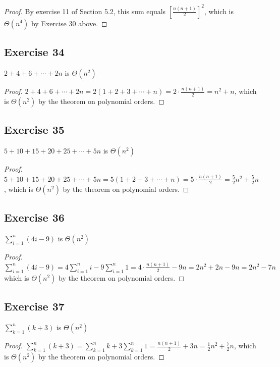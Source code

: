 \documentclass[14pt]{extarticle}
\newcommand{\dps}{\displaystyle}
\begin{document}
\begin{proof}
By exercise 11 of Section 5.2, this sum equals \(\dps \left[\frac{n(n+1)}{2}\right]^2\), which is \(\Theta(n^4)\) by Exercise 30 above.
\end{proof}

\subsection{Exercise 34}
\(2 + 4 + 6 + \cdots + 2n\) is \(\Theta(n^2)\)

\begin{proof}
\(2 + 4 + 6 + \cdots + 2n = 2(1+2+3+ \cdots + n) = 2 \cdot \frac{n(n+1)}{2} = n^2+n\),  which is \(\Theta(n^2)\) by the 
theorem on polynomial orders.
\end{proof}

\subsection{Exercise 35}
\(5 + 10 + 15 + 20 + 25 + \cdots + 5n\) is \(\Theta(n^2)\)

\begin{proof}
\(5 + 10 + 15 + 20 + 25 + \cdots + 5n = 5(1+2+3+ \cdots + n) = 5 \cdot \frac{n(n+1)}{2} = \frac{5}{2}n^2 + \frac{5}{2}n\),  
which is \(\Theta(n^2)\) by the theorem on polynomial orders.
\end{proof}

\subsection{Exercise 36}
\(\dps \sum_{i=1}^{n} (4i-9)\) is \(\Theta(n^2)\)

\begin{proof}
\(\dps \sum_{i=1}^{n} (4i-9) = 4\sum_{i=1}^n i - 9\sum_{i=1}^n 1 = 4 \cdot \frac{n(n+1)}{2} - 9n = 2n^2 + 2n - 9n = 2n^2-7n\)
which is \(\Theta(n^2)\) by the theorem on polynomial orders.
\end{proof}

\subsection{Exercise 37}
\(\dps \sum_{k=1}^{n} (k+3)\) is \(\Theta(n^2)\)

\begin{proof}
\(\dps \sum_{k=1}^{n} (k+3) = \sum_{k=1}^{n} k + 3\sum_{k=1}^{n} 1 = \frac{n(n+1)}{2} + 3n =\frac{1}{2}n^2+\frac{7}{2}n\),
which is \(\Theta(n^2)\) by the theorem on polynomial orders.
\end{proof}
\end{document}
